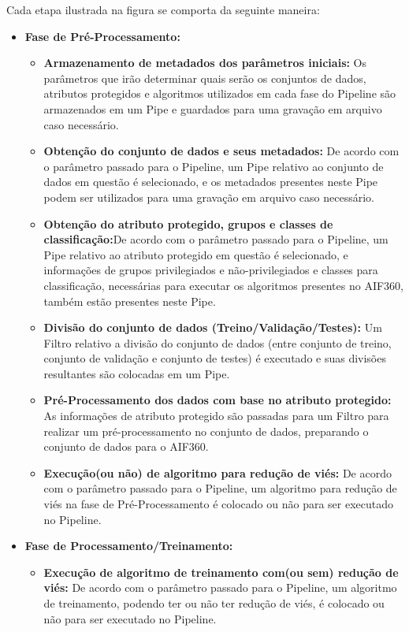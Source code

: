 \documentclass[portugues]{ic-tese}
\begin{document}
Cada etapa ilustrada na figura se comporta da seguinte maneira:

\begin{itemize}
\item \textbf{Fase de Pré-Processamento:}
	\begin{itemize}
	\item \textbf{Armazenamento de metadados dos parâmetros iniciais:} Os parâmetros que irão determinar quais serão os conjuntos de dados, atributos protegidos e algoritmos utilizados em cada fase do Pipeline são armazenados em um Pipe e guardados para uma gravação em arquivo caso necessário.
	\item \textbf{Obtenção do conjunto de dados e seus metadados:} De acordo com o parâmetro passado para o Pipeline, um Pipe relativo ao conjunto de dados em questão é selecionado, e os metadados presentes neste Pipe podem ser utilizados para uma gravação em arquivo caso necessário.
	\item \textbf{Obtenção do atributo protegido, grupos e classes de classificação:}De acordo com o parâmetro passado para o Pipeline, um Pipe relativo ao atributo protegido em questão é selecionado, e informações de grupos privilegiados e não-privilegiados e classes para classificação, necessárias para executar os algoritmos presentes no AIF360, também estão presentes neste Pipe.
	\item \textbf{Divisão do conjunto de dados (Treino/Validação/Testes):} Um Filtro relativo a divisão do conjunto de dados (entre conjunto de treino, conjunto de validação e conjunto de testes) é executado e suas divisões resultantes são colocadas em um Pipe.
	\item \textbf{Pré-Processamento dos dados com base no atributo protegido:} As informações de atributo protegido são passadas para um Filtro para realizar um pré-processamento no conjunto de dados, preparando o conjunto de dados para o AIF360.
	\item \textbf{Execução(ou não) de algoritmo para redução de viés:} De acordo com o parâmetro passado para o Pipeline, um algoritmo para redução de viés na fase de Pré-Processamento é colocado ou não para ser executado no Pipeline. 
	\end{itemize}
\item \textbf{Fase de Processamento/Treinamento:}
	\begin{itemize}
	\item \textbf{Execução de algoritmo de treinamento com(ou sem) redução de viés:} De acordo com o parâmetro passado para o Pipeline, um algoritmo de treinamento, podendo ter ou não ter redução de viés, é colocado ou não para ser executado no Pipeline.

\end{itemize}
\end{itemize}
\end{document}
